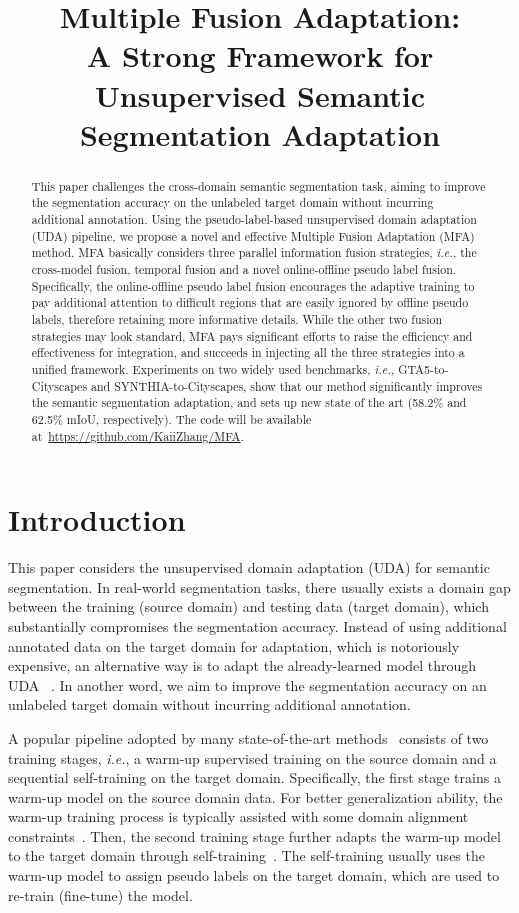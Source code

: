 \documentclass{bmvc2k}
\title{Multiple Fusion Adaptation:\\ A Strong Framework for Unsupervised Semantic Segmentation Adaptation}
\begin{document}
\maketitle

\begin{abstract}
This paper challenges the cross-domain semantic segmentation task, aiming to improve the segmentation accuracy on the unlabeled target domain without incurring additional annotation. Using the pseudo-label-based unsupervised domain adaptation (UDA) pipeline, we propose a novel and effective Multiple Fusion Adaptation (MFA) method. MFA basically considers three parallel information fusion strategies, \emph{i.e.}, the cross-model fusion, temporal fusion and a novel online-offline pseudo label fusion. Specifically, the online-offline pseudo label fusion encourages the adaptive training to pay additional attention to difficult regions that are easily ignored by offline pseudo labels, therefore retaining more informative details. While the other two fusion strategies may look standard, MFA pays significant efforts to raise the efficiency and effectiveness for integration, and succeeds in injecting all the three strategies into a unified framework. Experiments on two widely used benchmarks, \emph{i.e.}, GTA5-to-Cityscapes and SYNTHIA-to-Cityscapes, show that our method significantly improves the semantic segmentation adaptation, and sets up new state of the art (58.2\% and 62.5\% mIoU, respectively). The code will be available at~\url{https://github.com/KaiiZhang/MFA}.
\end{abstract}

\section{Introduction}

This paper considers the unsupervised domain adaptation (UDA) for semantic segmentation. In real-world segmentation tasks, there usually exists a domain gap between the training (source domain) and testing data (target domain), which substantially compromises the segmentation accuracy. Instead of using additional annotated data on the target domain for adaptation, which is notoriously expensive, an alternative way is to adapt the already-learned model through UDA ~\cite{hoffman2018cycada,RN180,RN162}. In another word, we aim to improve the segmentation accuracy on an unlabeled target domain without incurring additional annotation. 



A popular pipeline adopted by many state-of-the-art methods~\cite{RN180,RN132,zhang2021prototypical} consists of two training stages, \emph{i.e.}, a warm-up supervised training on the source domain and a sequential self-training on the target domain. Specifically, the first stage trains a warm-up model on the source domain data. For better generalization ability, the warm-up training process is typically assisted with some domain alignment constraints~\cite{RN166,RN135}. Then, the second training stage further adapts the warm-up model to the target domain through self-training~\cite{RN162, zou2019confidence}. The self-training usually uses the warm-up model to assign pseudo labels on the target domain, which are used to re-train (fine-tune) the model. 
\end{document}
